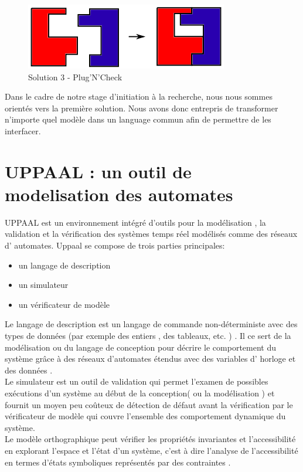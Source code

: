 \documentclass[12pt,a4paper]{report}
\begin{document}
\begin{figure}[h]
	\centering
	\includegraphics[scale=1]{ressources/solution3.png}
	\caption{Solution 3 - Plug'N'Check}
\end{figure}

Dans le cadre de notre stage d'initiation à la recherche, nous nous sommes 
orientés vers la première solution. Nous avons donc entrepris de transformer 
n'importe quel modèle dans un language commun afin de permettre de les 
interfacer.

\newpage
\section{UPPAAL : un outil de modelisation des automates}
UPPAAL est un environnement intégré d'outils pour la modélisation , la validation et la vérification des systèmes temps réel modélisés comme des réseaux d' automates.
Uppaal se compose de trois parties principales: 
\begin{itemize}[label=$\circ$]
  \item{ un langage de description}
  \item{ un simulateur}
  \item{ un vérificateur de modèle}
\end{itemize} 

  Le langage de description est un langage de commande non-déterministe avec des types de données (par exemple des entiers , des tableaux, etc. ) . Il ce sert de la modélisation ou du langage de conception pour décrire le comportement du système grâce à des réseaux d'automates étendus avec des variables d' horloge et des données .\\ 

  Le simulateur est un outil de validation qui permet l'examen de possibles exécutions d'un système au début de la conception( ou la modélisation ) et fournit un moyen peu coûteux de détection de défaut avant la vérification par le vérificateur de modèle qui couvre l'ensemble des comportement dynamique du système.\\

  Le modèle orthographique peut vérifier les propriétés invariantes et l'accessibilité en explorant l'espace et l'état d'un système, c'est à dire l'analyse de l'accessibilité en termes d'états symboliques représentés par des contraintes .
\end{document}
